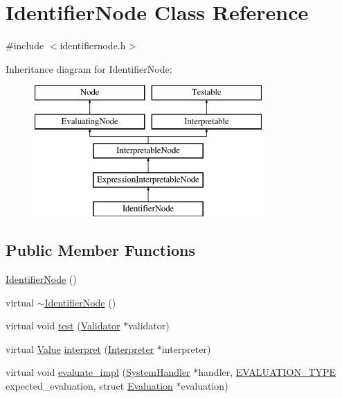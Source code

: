 \hypertarget{classIdentifierNode}{}\section{Identifier\+Node Class Reference}
\label{classIdentifierNode}


{\ttfamily \#include $<$identifiernode.\+h$>$}

Inheritance diagram for Identifier\+Node\+:\begin{figure}[H]
\begin{center}
\leavevmode
\includegraphics[height=5.000000cm]{classIdentifierNode}
\end{center}
\end{figure}
\subsection*{Public Member Functions}
\begin{DoxyCompactItemize}
\item 
\hyperlink{classIdentifierNode_ad12eaa3766a9650ce45b8188a9943755}{Identifier\+Node} ()
\item 
virtual \hyperlink{classIdentifierNode_a1c6fac2ceb5c9b7a435006b41898aa31}{$\sim$\+Identifier\+Node} ()
\item 
virtual void \hyperlink{classIdentifierNode_a1459965d8f22ade30cb78b2a1d60dd07}{test} (\hyperlink{classValidator}{Validator} $\ast$validator)
\item 
virtual \hyperlink{classValue}{Value} \hyperlink{classIdentifierNode_aa7be7da3e018352f8b549fcac3a8155a}{interpret} (\hyperlink{classInterpreter}{Interpreter} $\ast$interpreter)
\item 
virtual void \hyperlink{classIdentifierNode_a4960a1e68623066e413f8c2d68cee7e5}{evaluate\+\_\+impl} (\hyperlink{classSystemHandler}{System\+Handler} $\ast$handler, \hyperlink{statics_8h_a6664c451ca7787483a7981cc1de68dbb}{E\+V\+A\+L\+U\+A\+T\+I\+O\+N\+\_\+\+T\+Y\+PE} expected\+\_\+evaluation, struct \hyperlink{structEvaluation}{Evaluation} $\ast$evaluation)
\end{DoxyCompactItemize}
